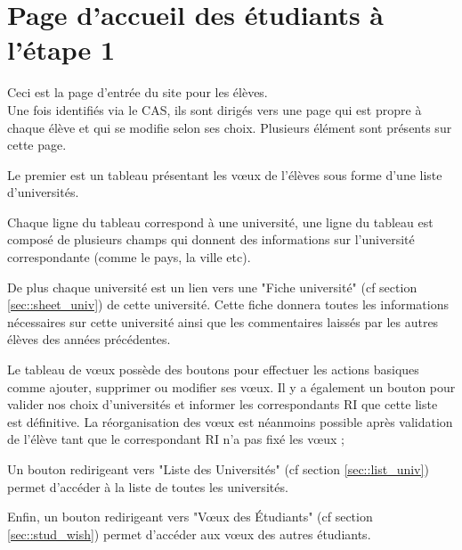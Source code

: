 \section{Page d'accueil des étudiants à l'étape 1}

Ceci est la page d'entrée du site pour les élèves.\\
Une fois identifiés via le CAS, ils sont dirigés vers une page qui est propre à chaque élève et qui se modifie selon ses choix.
Plusieurs élément sont présents sur cette page.

\bigbreak

Le premier est un tableau présentant les vœux de l'élèves sous forme d'une liste d'universités.

Chaque ligne du tableau correspond à une université, une ligne du tableau est composé de plusieurs champs qui donnent des informations sur l'université correspondante (comme le pays, la ville etc).

De plus chaque université est un lien vers une "Fiche université" (cf section \ref{sec::sheet_univ}) de cette université. Cette fiche donnera toutes les informations nécessaires sur cette université ainsi que les commentaires laissés par les autres élèves des années précédentes.

Le tableau de vœux possède des boutons pour effectuer les actions basiques comme ajouter, supprimer ou modifier ses vœux. Il y a également un bouton pour valider nos choix d'universités et informer les correspondants RI que cette liste est définitive. La réorganisation des vœux est néanmoins possible après validation de l'élève tant que le correspondant RI n'a pas fixé les vœux ;

\bigbreak

Un bouton redirigeant vers "Liste des Universités" (cf section \ref{sec::list_univ}) permet d'accéder à la liste de toutes les universités.

\bigbreak

Enfin, un bouton redirigeant vers "Vœux des Étudiants" (cf section \ref{sec::stud_wish}) permet d'accéder aux vœux des autres étudiants.
